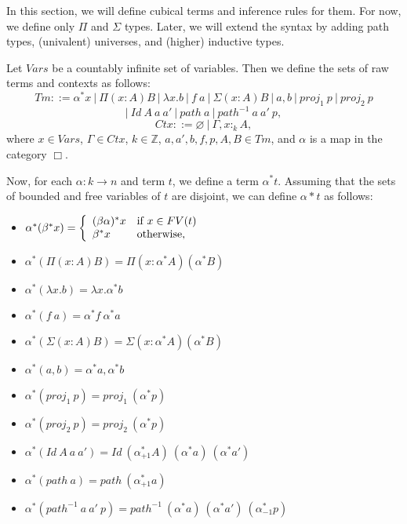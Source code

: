 \documentclass{amsart}
\theoremstyle{definition}
\theoremstyle{remark}
\newcommand{\Z}{\mathbb{Z}}
\numberwithin{table}{section}
\begin{document}
In this section, we will define cubical terms and inference rules for them.
For now, we define only $\Pi$ and $\Sigma$ types.
Later, we will extend the syntax by adding path types, (univalent) universes, and (higher) inductive types.

Let $Vars$ be a countably infinite set of variables.
Then we define the sets of raw terms and contexts as follows:
\[ Tm ::= \alpha^* x\ |\ \Pi (x : A) B\ |\ \lambda x. b\ |\ f\ a\ |\ \Sigma (x : A) B\ |\ a , b\ |\ proj_1\ p\ |\ proj_2\ p \]
\[ |\ Id\ A\ a\ a'\ |\ path\ a\ |\ path^{-1}\ a\ a'\ p, \]
\[ Ctx ::= \varnothing\ |\ \Gamma, x :_k A, \]
where $x \in Vars$, $\Gamma \in Ctx$, $k \in \Z$, $a, a', b, f, p, A, B \in Tm$, and $\alpha$ is a map in the category $\Box$.

Now, for each $\alpha : k \to n$ and term $t$, we define a term $\alpha^* t$.
Assuming that the sets of bounded and free variables of $t$ are disjoint, we can define $\alpha* t$ as follows:
\begin{itemize}
\item[] $\alpha^* (\beta^* x) = \left\{\begin{array}{l l}
            (\beta \alpha)^* x  & \text{if $x \in FV(t)$} \\
            \beta^* x           & \text{otherwise,}
        \end{array} \right.$
\item[] $\alpha^* (\Pi (x : A) B) = \Pi (x : \alpha^* A) (\alpha^* B)$
\item[] $\alpha^* (\lambda x. b) = \lambda x. \alpha^* b$
\item[] $\alpha^* (f\ a) = \alpha^* f\ \alpha^* a$
\item[] $\alpha^* (\Sigma (x : A) B) = \Sigma (x : \alpha^* A) (\alpha^* B)$
\item[] $\alpha^* (a , b) = \alpha^* a , \alpha^* b$
\item[] $\alpha^* (proj_1\ p) = proj_1\ (\alpha^* p)$
\item[] $\alpha^* (proj_2\ p) = proj_2\ (\alpha^* p)$
\item[] $\alpha^* (Id\ A\ a\ a') = Id\ (\alpha_{+1}^* A)\ (\alpha^* a)\ (\alpha^* a')$
\item[] $\alpha^* (path\ a) = path\ (\alpha_{+1}^* a)$
\item[] $\alpha^* (path^{-1}\ a\ a'\ p) = path^{-1}\ (\alpha^* a)\ (\alpha^* a')\ (\alpha_{-1}^* p)$
\end{itemize}

\centerAlignProof
\end{document}
